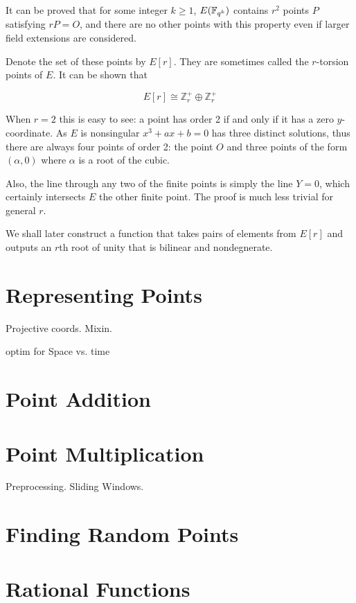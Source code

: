 It can be proved that for some integer $k \ge 1$,
$E(\mathbb{F}_{q^k})$ contains $r^2$ points $P$ satisfying $r P = O$,
and there are no other points with this property even if larger field
extensions are considered.

Denote the set of these points by $E[r]$. They are sometimes called the
$r$-torsion points of $E$. It can be shown that

\[ E[r] \cong \mathbb{Z}_r^+ \oplus \mathbb{Z}_r^+ \]

When $r=2$ this is easy to see: a point has order 2 if and only if it has
a zero $y$-coordinate. As $E$ is nonsingular
$x^3 + ax + b = 0$ has three distinct solutions, thus there are always
four points of order 2: the point $O$ and three points of the form
$(\alpha, 0)$ where $\alpha$ is a root of the cubic.

Also, the line through any two of the finite points is simply the line $Y = 0$,
which certainly intersects $E$ the other finite point.
The proof is much less trivial for general $r$.

We shall later construct a function
that takes pairs of elements from $E[r]$ and outputs an $r$th root of unity
that is bilinear and nondegnerate.

\section {Representing Points}

Projective coords. Mixin.

optim for Space vs. time

\section {Point Addition}

\section {Point Multiplication}

Preprocessing. Sliding Windows.

\section {Finding Random Points}

\section {Rational Functions}

